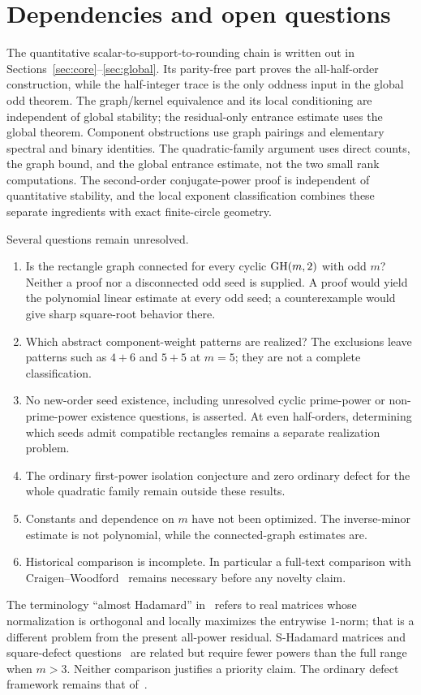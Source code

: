 \section{Dependencies and open questions}\label{sec:discussion}
The quantitative scalar-to-support-to-rounding chain is written out in Sections~\ref{sec:core}--\ref{sec:global}. Its parity-free part proves the all-half-order construction, while the half-integer trace is the only oddness input in the global odd theorem. The graph/kernel equivalence and its local conditioning are independent of global stability; the residual-only entrance estimate uses the global theorem. Component obstructions use graph pairings and elementary spectral and binary identities. The quadratic-family argument uses direct counts, the graph bound, and the global entrance estimate, not the two small rank computations. The second-order conjugate-power proof is independent of quantitative stability, and the local exponent classification combines these separate ingredients with exact finite-circle geometry.

Several questions remain unresolved.
\begin{enumerate}
\item Is the rectangle graph connected for every cyclic $\operatorname{GH}(m,2)$ with odd $m$? Neither a proof nor a disconnected odd seed is supplied. A proof would yield the polynomial linear estimate at every odd seed; a counterexample would give sharp square-root behavior there.
\item Which abstract component-weight patterns are realized? The exclusions leave patterns such as $4+6$ and $5+5$ at $m=5$; they are not a complete classification.
\item No new-order seed existence, including unresolved cyclic prime-power or non-prime-power existence questions, is asserted. At even half-orders, determining which seeds admit compatible rectangles remains a separate realization problem.
\item The ordinary first-power isolation conjecture and zero ordinary defect for the whole quadratic family remain outside these results.
\item Constants and dependence on $m$ have not been optimized. The inverse-minor estimate is not polynomial, while the connected-graph estimates are.
\item Historical comparison is incomplete. In particular a full-text comparison with Craigen--Woodford~\cite{CW} remains necessary before any novelty claim.
\end{enumerate}
The terminology ``almost Hadamard'' in~\cite{BNZ} refers to real matrices whose normalization is orthogonal and locally maximizes the entrywise $1$-norm; that is a different problem from the present all-power residual. S-Hadamard matrices and square-defect questions~\cite{Phangara} are related but require fewer powers than the full range when $m>3$. Neither comparison justifies a priority claim. The ordinary defect framework remains that of~\cite{TZ}.
